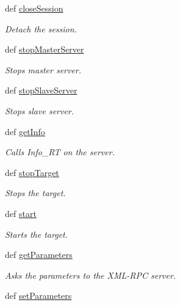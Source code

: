 \begin{DoxyCompactItemize}
def \hyperlink{classpyrtai_1_1connector_1_1_connector_a602fb1cd3d85b5ec936e9df02505990f}{close\-Session}
\begin{DoxyCompactList}\small\item\em \-Detach the session. \end{DoxyCompactList}\item 
def \hyperlink{classpyrtai_1_1connector_1_1_connector_a1853745bd76def6f4799a86998284fa0}{stop\-Master\-Server}
\begin{DoxyCompactList}\small\item\em \-Stops master server. \end{DoxyCompactList}\item 
def \hyperlink{classpyrtai_1_1connector_1_1_connector_aad64834c8e8a1d8e21cb005274034df7}{stop\-Slave\-Server}
\begin{DoxyCompactList}\small\item\em \-Stops slave server. \end{DoxyCompactList}\item 
def \hyperlink{classpyrtai_1_1connector_1_1_connector_ad7fe5e2d137913f7235ebeec660df3f1}{get\-Info}
\begin{DoxyCompactList}\small\item\em \-Calls \-Info\-\_\-\-R\-T on the server. \end{DoxyCompactList}\item 
def \hyperlink{classpyrtai_1_1connector_1_1_connector_a9a19798e6a3310b09e27c54dbd510e43}{stop\-Target}
\begin{DoxyCompactList}\small\item\em \-Stops the target. \end{DoxyCompactList}\item 
def \hyperlink{classpyrtai_1_1connector_1_1_connector_a43a03b4cd87b67d8988e1664e044d0bc}{start}
\begin{DoxyCompactList}\small\item\em \-Starts the target. \end{DoxyCompactList}\item 
def \hyperlink{classpyrtai_1_1connector_1_1_connector_a0125ba90cc00f28788ddf8598b50821b}{get\-Parameters}
\begin{DoxyCompactList}\small\item\em \-Asks the parameters to the \-X\-M\-L-\/\-R\-P\-C server. \end{DoxyCompactList}\item 
def \hyperlink{classpyrtai_1_1connector_1_1_connector_aba2c89d4b25e8b3e252825fbd8ec21a0}{set\-Parameters}

\end{DoxyCompactItemize}
